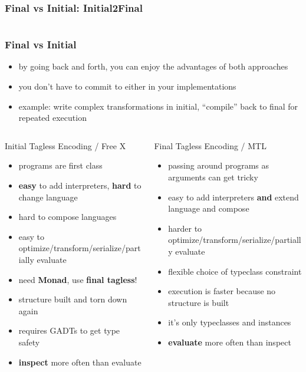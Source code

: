 \documentclass[aspectratio=169, hyperref={colorlinks, linkcolor=beamer@centricgreen}, urlcolor=links]{beamer}
\begin{document}
\begin{frame}[fragile]
  \frametitle{Final vs Initial: Initial2Final}
  \inputminted[fontsize=\footnotesize]{scala}{snippets/initial-to-final.scala}
\end{frame}

\begin{frame}
  \frametitle{Final vs Initial}
  \begin{itemize}
  \item by going back and forth, you can enjoy the advantages of both approaches
  \item you don't have to commit to either in your implementations
  \item example: write complex transformations in initial, ``compile'' back to final for repeated execution
  \end{itemize}
\end{frame}

\begin{frame}[t]
  \small{}
  \begin{columns}
    \begin{column}{0.5\textwidth}
      Initial Tagless Encoding / Free X
      \begin{itemize}
      \item programs are first class
      \item \textbf{easy} to add interpreters, \textbf{hard} to change language
      \item hard to compose languages
      \item easy to optimize/transform/serialize/partially evaluate
      \item need \textbf{Monad}, use \textbf{final tagless}!
      \item structure built and torn down again
      \item requires GADTs to get type safety
      \item \textbf{inspect} more often than evaluate
      \end{itemize}
    \end{column}
    \begin{column}{0.5\textwidth}
      Final Tagless Encoding / MTL
      \begin{itemize}
      \item passing around programs as arguments can get tricky
      \item easy to add interpreters \textbf{and} extend language and compose
      \item harder to optimize/transform/serialize/partially evaluate
      \item flexible choice of typeclass constraint
      \item execution is faster because no structure is built
      \item it's only typeclasses and instances
      \item \textbf{evaluate} more often than inspect
      \end{itemize}
    \end{column}
  \end{columns}
\end{frame}
\end{document}
